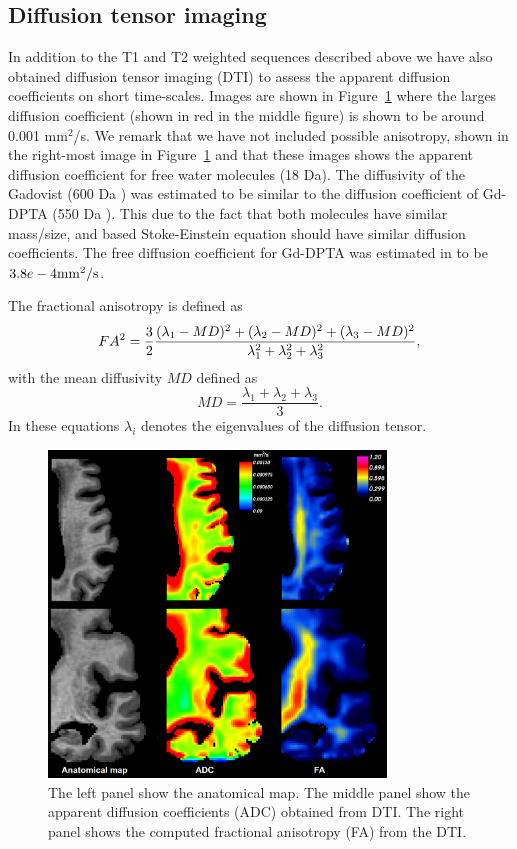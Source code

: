 \documentclass[11pt,a4paper]{article}
\begin{document}
\subsection{Diffusion tensor imaging}
In addition to the T1 and T2 weighted sequences described above we have also obtained diffusion tensor imaging (DTI) to assess the apparent diffusion 
coefficients on short time-scales. Images are shown in Figure~\ref{figuredti} where the larges diffusion coefficient (shown in 
red in the middle figure) is shown to be around 0.001 mm$^2$/s. We remark that we have not included possible anisotropy, shown in 
the right-most image in Figure~\ref{figuredti} and that these images shows the apparent diffusion coefficient for free water molecules (18 Da).      
The diffusivity of the Gadovist (600 Da \cite{MGadobutrol}) was estimated to be similar to the diffusion coefficient of Gd-DPTA (550 Da \cite{MGgDPTA}). This due to the fact that both molecules have similar mass/size, and based Stoke-Einstein equation should have similar diffusion coefficients. The free diffusion coefficient for Gd-DPTA was estimated in \cite{GdDPTA-DIFFUSION} to be $3.8e-4\mathrm{mm\sp{2}/s}$.


The fractional anisotropy is defined as 
\begin{equation}
FA\sp{2} =  \frac{3}{2} \frac{ (\lambda_1 - MD )\sp{2} +(\lambda_2 - MD )\sp{2} +(\lambda_3 - MD )\sp{2}}{\lambda\sp{2}_1 + \lambda\sp{2}_2  +\lambda\sp{2}_3 },
\end{equation}
with the mean diffusivity $MD$ defined as 
\begin{equation}
MD = \frac{\lambda_1 +\lambda_2 +\lambda_3 }{3}.
\end{equation}
In these equations $\lambda_i$ denotes the eigenvalues of the diffusion tensor.
\begin{figure}
\centering
\includegraphics[width=0.80\textwidth]{DTI-zoom.png} 
\caption{The left panel show the anatomical map. The middle panel show the apparent diffusion coefficients (ADC) obtained from DTI. The right panel shows the computed fractional anisotropy (FA) from the DTI.}
\label{figuredti} 
\end{figure}
\end{document}
